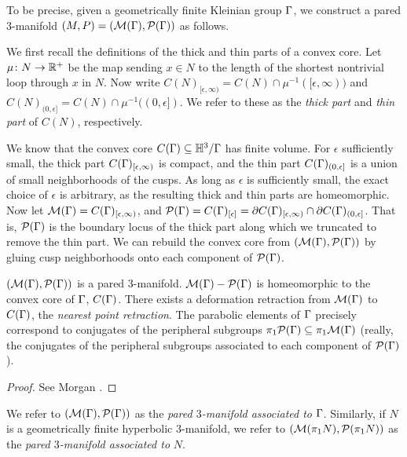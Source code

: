 To be precise, given a geometrically finite Kleinian group $\Gamma$, we construct
a pared $3$-manifold $(M,P)=(\mathcal{M}(\Gamma),\mathcal{P}(\Gamma))$ as follows.

We first recall the definitions of the thick and thin parts of a convex core.
Let $\mu \colon N \to \mathbb{R}^+$ be the map sending $x\in N$ to the length of the
shortest nontrivial loop through $x$ in $N$. Now write
$C(N)_{[\epsilon,\infty)} = C(N) \cap \mu^{-1}([\epsilon,\infty))$ and
$C(N)_{(0,\epsilon]} = C(N) \cap \mu^{-1}((0,\epsilon])$. We refer to these as
the \emph{thick part} and \emph{thin part} of $C(N)$, respectively.

We know that the convex core $C(\Gamma) \subseteq \mathbb{H}^3/\Gamma$ has finite volume. For
$\epsilon$ sufficiently small, the thick part $C(\Gamma)_{[\epsilon,\infty)}$ is
compact, and the thin part $C(\Gamma)_{(0,\epsilon]}$ is a union of small
neighborhoods of the cusps.  As long as $\epsilon$ is sufficiently small, the
exact choice of $\epsilon$ is arbitrary, as the resulting thick and thin parts
are homeomorphic.  Now let $\mathcal{M}(\Gamma) = C(\Gamma)_{[\epsilon,\infty)}$, and
$\mathcal{P}(\Gamma) = C(\Gamma)_{[\epsilon]} = \partial C(\Gamma)_{[\epsilon,\infty)} \cap \partial
C(\Gamma)_{(0,\epsilon]}$.  That is, $\mathcal{P}(\Gamma)$ is the boundary locus of the thick
part along which we truncated to remove the thin part. We can rebuild the
convex core from $(\mathcal{M}(\Gamma),\mathcal{P}(\Gamma))$ by gluing cusp neighborhoods onto each
component of $\mathcal{P}(\Gamma)$.

\begin{prop}

$(\mathcal{M}(\Gamma),\mathcal{P}(\Gamma))$ is a pared $3$-manifold. $\mathcal{M}(\Gamma)- \mathcal{P}(\Gamma)$ is
homeomorphic to the convex core of $\Gamma$, $C(\Gamma)$. There exists a deformation
retraction from $\mathcal{M}(\Gamma)$ to $C(\Gamma)$, the \emph{nearest point retraction}.
The parabolic elements of $\Gamma$ precisely correspond to conjugates of the
peripheral subgroups $\pi_1\mathcal{P}(\Gamma) \subseteq \pi_1\mathcal{M}(\Gamma)$ (really, the conjugates
of the peripheral subgroups associated to each component of $\mathcal{P}(\Gamma)$).

\end{prop}

\begin{proof}

See Morgan \cite[Lemma 6.1 and Corollary 6.10]{Mo}. %

\end{proof}

We refer to $(\mathcal{M}(\Gamma),\mathcal{P}(\Gamma))$ as the \emph{pared $3$-manifold associated
to} $\Gamma$.  Similarly, if $N$ is a geometrically finite hyperbolic
$3$-manifold, we refer to $(\mathcal{M}(\pi_1N),\mathcal{P}(\pi_1N))$ as the \emph{pared
$3$-manifold associated to} $N$.

